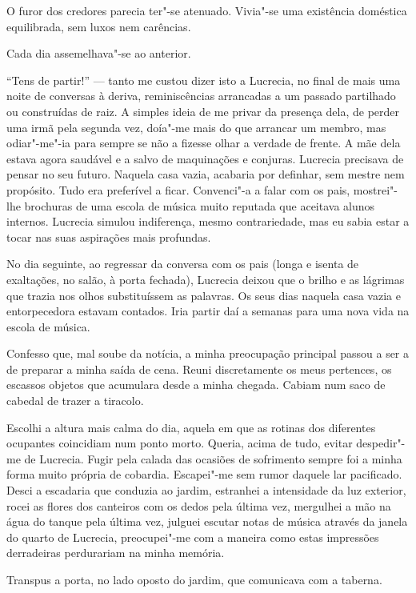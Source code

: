 O furor dos credores parecia ter"-se atenuado. Vivia"-se uma existência
doméstica equilibrada, sem luxos nem carências.

Cada dia assemelhava"-se ao anterior.

``Tens de partir!'' --- tanto me custou dizer isto a Lucrecia, no final de
mais uma noite de conversas à deriva, reminiscências arrancadas a um
passado partilhado ou construídas de raiz. A simples ideia de me privar
da presença dela, de perder uma irmã pela segunda vez, doía"-me mais do
que arrancar um membro, mas odiar"-me"-ia para sempre se não a fizesse
olhar a verdade de frente. A mãe dela estava agora saudável e a salvo de
maquinações e conjuras. Lucrecia precisava de pensar no seu futuro.
Naquela casa vazia, acabaria por definhar, sem
mestre nem propósito. Tudo era preferível a ficar. Convenci"-a a falar
com os pais, mostrei"-lhe brochuras de uma escola de música muito
reputada que aceitava alunos internos. Lucrecia simulou indiferença,
mesmo contrariedade, mas eu sabia estar a tocar nas suas aspirações mais
profundas.

No dia seguinte, ao regressar da conversa com os pais (longa e isenta de
exaltações, no salão, à porta fechada), Lucrecia deixou que o brilho e
as lágrimas que trazia nos olhos substituíssem as palavras. Os seus dias
naquela casa vazia e entorpecedora estavam contados. Iria partir daí a
semanas para uma nova vida na escola de música.

Confesso que, mal soube da notícia, a minha preocupação principal passou
a ser a de preparar a minha saída de cena. Reuni discretamente os meus
pertences, os escassos objetos que acumulara desde a minha chegada.
Cabiam num saco de cabedal de trazer a tiracolo.

Escolhi a altura mais calma do dia, aquela em que as rotinas dos
diferentes ocupantes coincidiam num ponto morto. Queria, acima de tudo,
evitar despedir"-me de Lucrecia. Fugir pela calada das ocasiões de
sofrimento sempre foi a minha forma muito própria de cobardia.
Escapei"-me sem rumor daquele lar pacificado. Desci a escadaria que
conduzia ao jardim, estranhei a intensidade da luz exterior, rocei as
flores dos canteiros com os dedos pela última vez, mergulhei a mão na
água do tanque pela última vez, julguei escutar notas de música
através da janela do quarto de Lucrecia, preocupei"-me com a maneira como
estas impressões derradeiras perdurariam na minha memória.

Transpus a porta, no lado oposto do jardim, que comunicava com a
taberna.

